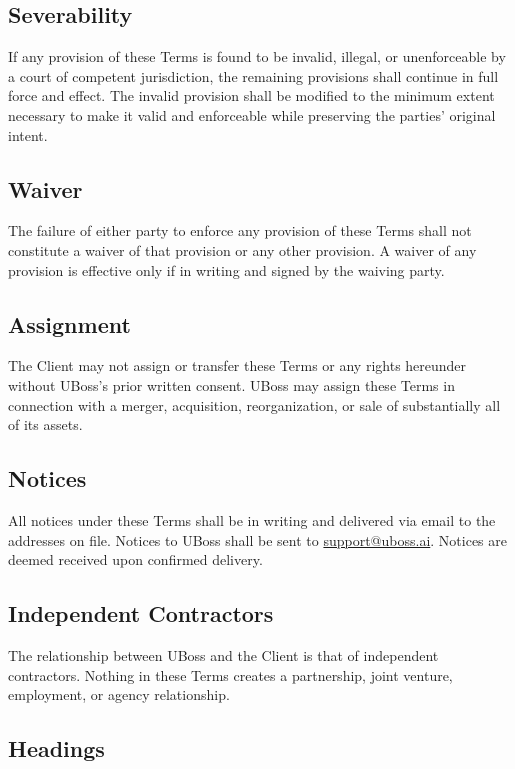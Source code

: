 \documentclass[11pt,letterpaper,parskip=half]{scrartcl}
\begin{document}
\subsection{Severability}

If any provision of these Terms is found to be invalid, illegal, or unenforceable by a court of competent jurisdiction, the remaining provisions shall continue in full force and effect. The invalid provision shall be modified to the minimum extent necessary to make it valid and enforceable while preserving the parties' original intent.

\subsection{Waiver}

The failure of either party to enforce any provision of these Terms shall not constitute a waiver of that provision or any other provision. A waiver of any provision is effective only if in writing and signed by the waiving party.

\subsection{Assignment}

The Client may not assign or transfer these Terms or any rights hereunder without UBoss's prior written consent. UBoss may assign these Terms in connection with a merger, acquisition, reorganization, or sale of substantially all of its assets.

\subsection{Notices}

All notices under these Terms shall be in writing and delivered via email to the addresses on file. Notices to UBoss shall be sent to \href{mailto:support@uboss.ai}{support@uboss.ai}. Notices are deemed received upon confirmed delivery.

\subsection{Independent Contractors}

The relationship between UBoss and the Client is that of independent contractors. Nothing in these Terms creates a partnership, joint venture, employment, or agency relationship.

\subsection{Headings}
\end{document}
